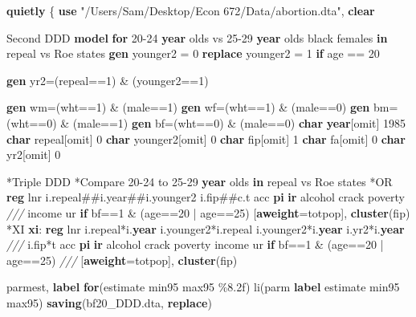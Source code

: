 \documentclass[
]{book}
\newenvironment{Shaded}{\begin{snugshade}}{\end{snugshade}}
\newcommand{\BaseNTok}[1]{\textcolor[rgb]{0.00,0.00,0.81}{#1}}
\newcommand{\CommentTok}[1]{\textcolor[rgb]{0.56,0.35,0.01}{\textit{#1}}}
\newcommand{\FunctionTok}[1]{\textcolor[rgb]{0.13,0.29,0.53}{\textbf{#1}}}
\newcommand{\KeywordTok}[1]{\textcolor[rgb]{0.13,0.29,0.53}{\textbf{#1}}}
\newcommand{\NormalTok}[1]{#1}
\newcommand{\StringTok}[1]{\textcolor[rgb]{0.31,0.60,0.02}{#1}}
\begin{document}
\begin{Shaded}
\begin{Highlighting}[]
\KeywordTok{quietly}\NormalTok{ \{}
\KeywordTok{use} \StringTok{"/Users/Sam/Desktop/Econ 672/Data/abortion.dta"}\NormalTok{, }\KeywordTok{clear}

\NormalTok{Second DDD }\KeywordTok{model} \KeywordTok{for}\NormalTok{ 20{-}24 }\FunctionTok{year}\NormalTok{ olds vs 25{-}29 }\FunctionTok{year}\NormalTok{ olds }\BaseNTok{black}\NormalTok{ females }\KeywordTok{in}\NormalTok{ repeal vs Roe states}
\KeywordTok{gen}\NormalTok{ younger2 = 0 }
\KeywordTok{replace}\NormalTok{ younger2 = 1 }\KeywordTok{if}\NormalTok{ age == 20}

\KeywordTok{gen}\NormalTok{ yr2=(repeal==1) \& (younger2==1)}

\KeywordTok{gen}\NormalTok{ wm=(wht==1) \& (male==1)}
\KeywordTok{gen}\NormalTok{ wf=(wht==1) \& (male==0)}
\KeywordTok{gen}\NormalTok{ bm=(wht==0) \& (male==1)}
\KeywordTok{gen}\NormalTok{ bf=(wht==0) \& (male==0)}
\FunctionTok{char} \FunctionTok{year}\NormalTok{[omit] 1985 }
\FunctionTok{char}\NormalTok{ repeal[omit] 0 }
\FunctionTok{char}\NormalTok{ younger2[omit] 0 }
\FunctionTok{char}\NormalTok{ fip[omit] 1 }
\FunctionTok{char}\NormalTok{ fa[omit] 0 }
\FunctionTok{char}\NormalTok{ yr2[omit] 0 }

\NormalTok{*Triple DDD }
\NormalTok{*Compare 20{-}24 to 25{-}29 }\FunctionTok{year}\NormalTok{ olds }\KeywordTok{in}\NormalTok{ repeal vs Roe states}
\NormalTok{*OR}
\KeywordTok{reg}\NormalTok{ lnr i.repeal\#\#i.year\#\#i.younger2 i.fip\#\#c.t acc }\KeywordTok{pi} \KeywordTok{ir}\NormalTok{ alcohol crack  poverty }\CommentTok{///}
\NormalTok{ income ur }\KeywordTok{if}\NormalTok{ bf==1 \& (age==20 | age==25) [}\KeywordTok{aweight}\NormalTok{=totpop], }\KeywordTok{cluster}\NormalTok{(fip) }
\NormalTok{*XI}
\KeywordTok{xi}\NormalTok{: }\KeywordTok{reg}\NormalTok{ lnr i.repeal*i.}\FunctionTok{year}\NormalTok{ i.younger2*i.repeal i.younger2*i.}\FunctionTok{year}\NormalTok{ i.yr2*i.}\FunctionTok{year} \CommentTok{///}
\NormalTok{  i.fip*t acc }\KeywordTok{pi} \KeywordTok{ir}\NormalTok{ alcohol crack  poverty income ur }\KeywordTok{if}\NormalTok{ bf==1 \& (age==20 | age==25) }\CommentTok{///}
\NormalTok{  [}\KeywordTok{aweight}\NormalTok{=totpop], }\KeywordTok{cluster}\NormalTok{(fip) }
  
\NormalTok{ parmest, }\KeywordTok{label} \KeywordTok{for}\NormalTok{(estimate min95 max95 \%8.2f) li(parm }\KeywordTok{label}\NormalTok{ estimate min95 max95) }\KeywordTok{saving}\NormalTok{(bf20\_DDD.dta, }\KeywordTok{replace}\NormalTok{)}


\end{Highlighting}
\end{Shaded}
\end{document}
